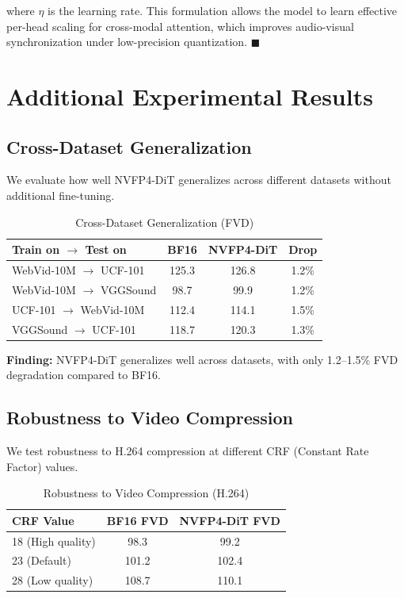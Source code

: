 \documentclass[journal,twoside]{IEEEtran}
\theoremstyle{definition}
\theoremstyle{remark}
\begin{document}
where $\eta$ is the learning rate. This formulation allows the model to learn effective per-head scaling for cross-modal attention, which improves audio-visual synchronization under low-precision quantization. \hfill $\blacksquare$

\section{Additional Experimental Results}
\label{app:d}

\FloatBarrier
\subsection{Cross-Dataset Generalization}

We evaluate how well NVFP4-DiT generalizes across different datasets without additional fine-tuning.

\begin{table}[H]
\centering
\caption{Cross-Dataset Generalization (FVD)}
\label{tab:cross_dataset}
\begin{tabular}{lccc}
\toprule
Train on $\rightarrow$ Test on & BF16 & NVFP4-DiT & Drop \\
\midrule
WebVid-10M $\rightarrow$ UCF-101 & 125.3 & 126.8 & 1.2\% \\
WebVid-10M $\rightarrow$ VGGSound & 98.7 & 99.9 & 1.2\% \\
UCF-101 $\rightarrow$ WebVid-10M & 112.4 & 114.1 & 1.5\% \\
VGGSound $\rightarrow$ UCF-101 & 118.7 & 120.3 & 1.3\% \\
\bottomrule
\end{tabular}
\end{table}

\textbf{Finding:} NVFP4-DiT generalizes well across datasets, with only 1.2--1.5\% FVD degradation compared to BF16.

\subsection{Robustness to Video Compression}

We test robustness to H.264 compression at different CRF (Constant Rate Factor) values.

\begin{table}[H]
\centering
\caption{Robustness to Video Compression (H.264)}
\label{tab:compression}
\begin{tabular}{lcc}
\toprule
CRF Value & BF16 FVD & NVFP4-DiT FVD \\
\midrule
18 (High quality) & 98.3 & 99.2 \\
23 (Default) & 101.2 & 102.4 \\
28 (Low quality) & 108.7 & 110.1 \\
\bottomrule
\end{tabular}
\end{table}
\end{document}
